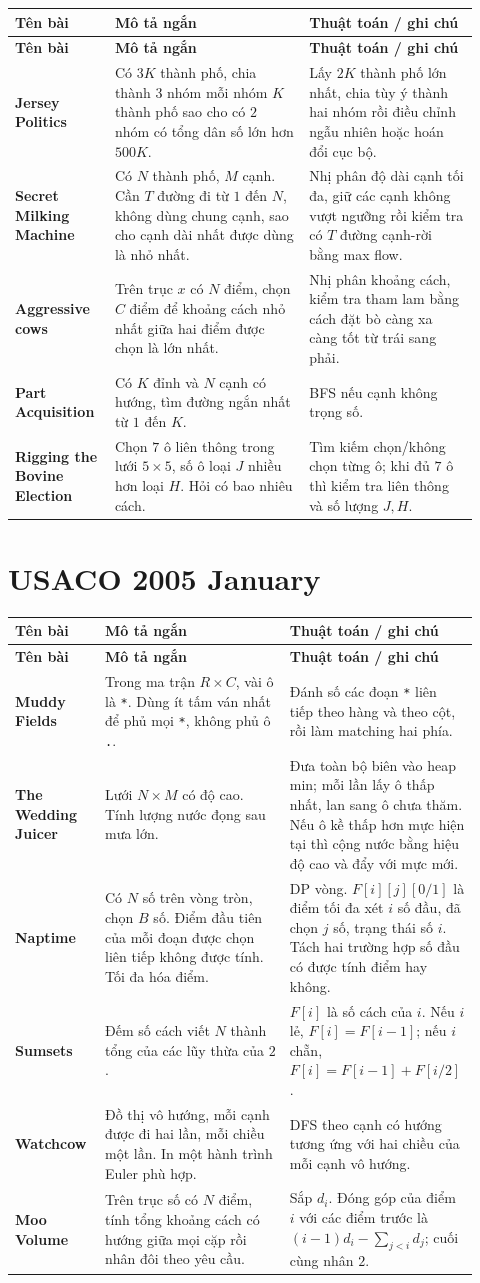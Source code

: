 \documentclass[11pt]{article}
\newenvironment{solutiontable}{%
  \small
  \setlength{\tabcolsep}{4pt}
  \renewcommand{\arraystretch}{1.14}
  \begin{longtable}{L{0.19\linewidth}L{0.39\linewidth}L{0.34\linewidth}}
  \toprule
  \textbf{Tên bài} & \textbf{Mô tả ngắn} & \textbf{Thuật toán / ghi chú}\\
  \midrule
  \endfirsthead
  \toprule
  \textbf{Tên bài} & \textbf{Mô tả ngắn} & \textbf{Thuật toán / ghi chú}\\
  \midrule
  \endhead
}{%
  \bottomrule
  \end{longtable}
  \normalsize
}
\newcommand{\problemrow}[3]{\textbf{#1} & #2 & #3\\\midrule}
\begin{document}
\begin{solutiontable}
\problemrow{Jersey Politics}{Có \(3K\) thành phố, chia thành \(3\) nhóm mỗi nhóm \(K\) thành phố sao cho có \(2\) nhóm có tổng dân số lớn hơn \(500K\).}{Lấy \(2K\) thành phố lớn nhất, chia tùy ý thành hai nhóm rồi điều chỉnh ngẫu nhiên hoặc hoán đổi cục bộ.}
\problemrow{Secret Milking Machine}{Có \(N\) thành phố, \(M\) cạnh. Cần \(T\) đường đi từ \(1\) đến \(N\), không dùng chung cạnh, sao cho cạnh dài nhất được dùng là nhỏ nhất.}{Nhị phân độ dài cạnh tối đa, giữ các cạnh không vượt ngưỡng rồi kiểm tra có \(T\) đường cạnh-rời bằng max flow.}
\problemrow{Aggressive cows}{Trên trục \(x\) có \(N\) điểm, chọn \(C\) điểm để khoảng cách nhỏ nhất giữa hai điểm được chọn là lớn nhất.}{Nhị phân khoảng cách, kiểm tra tham lam bằng cách đặt bò càng xa càng tốt từ trái sang phải.}
\problemrow{Part Acquisition}{Có \(K\) đỉnh và \(N\) cạnh có hướng, tìm đường ngắn nhất từ \(1\) đến \(K\).}{BFS nếu cạnh không trọng số.}
\problemrow{Rigging the Bovine Election}{Chọn \(7\) ô liên thông trong lưới \(5\times5\), số ô loại \(J\) nhiều hơn loại \(H\). Hỏi có bao nhiêu cách.}{Tìm kiếm chọn/không chọn từng ô; khi đủ \(7\) ô thì kiểm tra liên thông và số lượng \(J,H\).}
\end{solutiontable}

\section{USACO 2005 January}

\begin{solutiontable}
\problemrow{Muddy Fields}{Trong ma trận \(R\times C\), vài ô là \texttt{*}. Dùng ít tấm ván nhất để phủ mọi \texttt{*}, không phủ ô \texttt{.}.}{Đánh số các đoạn \texttt{*} liên tiếp theo hàng và theo cột, rồi làm matching hai phía.}
\problemrow{The Wedding Juicer}{Lưới \(N\times M\) có độ cao. Tính lượng nước đọng sau mưa lớn.}{Đưa toàn bộ biên vào heap min; mỗi lần lấy ô thấp nhất, lan sang ô chưa thăm. Nếu ô kề thấp hơn mực hiện tại thì cộng nước bằng hiệu độ cao và đẩy với mực mới.}
\problemrow{Naptime}{Có \(N\) số trên vòng tròn, chọn \(B\) số. Điểm đầu tiên của mỗi đoạn được chọn liên tiếp không được tính. Tối đa hóa điểm.}{DP vòng. \(F[i][j][0/1]\) là điểm tối đa xét \(i\) số đầu, đã chọn \(j\) số, trạng thái số \(i\). Tách hai trường hợp số đầu có được tính điểm hay không.}
\problemrow{Sumsets}{Đếm số cách viết \(N\) thành tổng của các lũy thừa của \(2\).}{\(F[i]\) là số cách của \(i\). Nếu \(i\) lẻ, \(F[i]=F[i-1]\); nếu \(i\) chẵn, \(F[i]=F[i-1]+F[i/2]\).}
\problemrow{Watchcow}{Đồ thị vô hướng, mỗi cạnh được đi hai lần, mỗi chiều một lần. In một hành trình Euler phù hợp.}{DFS theo cạnh có hướng tương ứng với hai chiều của mỗi cạnh vô hướng.}
\problemrow{Moo Volume}{Trên trục số có \(N\) điểm, tính tổng khoảng cách có hướng giữa mọi cặp rồi nhân đôi theo yêu cầu.}{Sắp \(d_i\). Đóng góp của điểm \(i\) với các điểm trước là \((i-1)d_i-\sum_{j<i}d_j\); cuối cùng nhân \(2\).}
\end{solutiontable}
\end{document}
